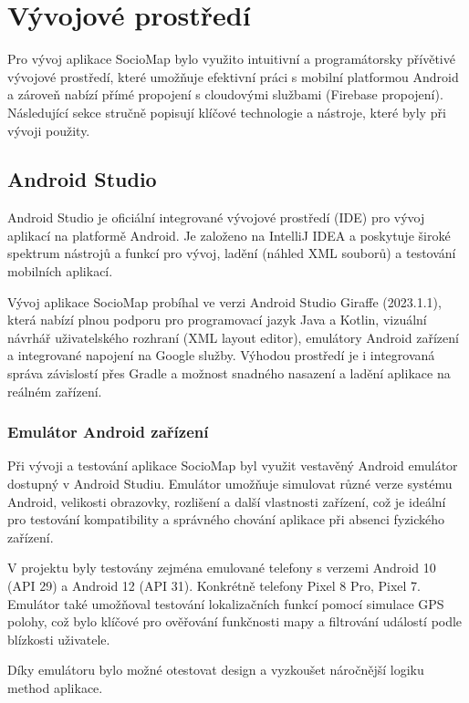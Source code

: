\chapter{Vývojové prostředí}

Pro vývoj aplikace SocioMap bylo využito intuitivní a programátorsky přívětivé vývojové prostředí, které umožňuje efektivní práci s mobilní platformou Android a zároveň nabízí přímé propojení s cloudovými službami (Firebase propojení). Následující sekce stručně popisují klíčové technologie a nástroje, které byly při vývoji použity.

\section{Android Studio}

Android Studio je oficiální integrované vývojové prostředí (IDE) pro vývoj aplikací na platformě Android. Je založeno na IntelliJ IDEA a poskytuje široké spektrum nástrojů a funkcí pro vývoj, ladění (náhled XML souborů) a testování mobilních aplikací.

Vývoj aplikace SocioMap probíhal ve verzi Android Studio Giraffe (2023.1.1), která nabízí plnou podporu pro programovací jazyk Java a Kotlin, vizuální návrhář uživatelského rozhraní (XML layout editor), emulátory Android zařízení a integrované napojení na Google služby. Výhodou prostředí je i integrovaná správa závislostí přes Gradle a možnost snadného nasazení a ladění aplikace na reálném zařízení.

\subsection{Emulátor Android zařízení}

Při vývoji a testování aplikace SocioMap byl využit vestavěný Android emulátor dostupný v Android Studiu. Emulátor umožňuje simulovat různé verze systému Android, velikosti obrazovky, rozlišení a další vlastnosti zařízení, což je ideální pro testování kompatibility a správného chování aplikace při absenci fyzického zařízení.

V projektu byly testovány zejména emulované telefony s verzemi Android 10 (API 29) a Android 12 (API 31). Konkrétně telefony Pixel 8 Pro, Pixel 7. Emulátor také umožňoval testování lokalizačních funkcí pomocí simulace GPS polohy, což bylo klíčové pro ověřování funkčnosti mapy a filtrování událostí podle blízkosti uživatele.

Díky emulátoru bylo možné otestovat design a vyzkoušet náročnější logiku method aplikace.

